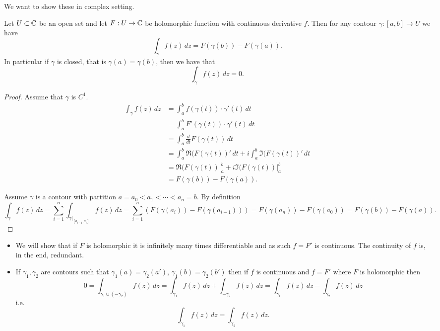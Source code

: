 \documentclass[10pt, a4paper]{article}
\begin{document}
We want to show these in complex setting.

\begin{theorem}
    Let $U \subset \mathbb{C}$ be an open set and let $F : U \to \mathbb{C}$ be holomorphic function with continuous derivative $f$.
    Then for any contour $\gamma : [a, b] \to U$ we have
    \[
    \int_{\gamma}f(z)\,dz = F(\gamma(b)) - F(\gamma(a)).
    \]
    In particular if $\gamma$ is closed,
    that is $\gamma(a) = \gamma(b)$,
    then we have that
    \[
    \int_{\gamma}f(z)\,dz = 0.
    \]

    \begin{proof}
        Assume that $\gamma$ is $C ^ 1$.
        \begin{align*}
            \int_{\gamma}f(z)\,dz &= \int_{a}^{b}f(\gamma(t))\cdot\gamma'(t)\,dt \\
            &= \int_{a}^{b}F'(\gamma(t))\cdot\gamma'(t)\,dt \\
            &= \int_{a}^{b}\frac{d}{dt}F(\gamma(t))\,dt \\
            &= \int_{a}^{b}\Re(F(\gamma(t))'\,dt + i\int_{a}^{b}\Im(F(\gamma(t))'\,dt \\
            &= \Re(F(\gamma(t))\big|_{a}^{b} + i\Im(F(\gamma(t))\big|_{a}^{b} \\
            &= F(\gamma(b)) - F(\gamma(a)).
        \end{align*}

        Assume $\gamma$ is a contour with partition $a = a_0 < a_1 < \dotsi < a_n = b$.
        By definition
        \[
        \int_{\gamma}f(z)\,dz = \sum_{i = 1}^{n}\int_{\gamma|_{[a_{i - 1}, a_i]}}f(z)\,dz = \sum_{i = 1}^{n}(F(\gamma(a_i)) - F(\gamma(a_{i - 1}))) = F(\gamma(a_n)) - F(\gamma(a_0)) = F(\gamma(b)) - F(\gamma(a)).
        \]
    \end{proof}
\end{theorem}

\begin{remark}\phantom{}
    \begin{itemize}
        \item We will show that if $F$ is holomorphic it is infinitely many times differentiable and as such $f = F'$ is continuous.
        The continuity of $f$ is,
        in the end,
        redundant.

        \item If $\gamma_1, \gamma_2$ are contours such that $\gamma_1(a) = \gamma_2(a')$,
        $\gamma_1(b) = \gamma_2(b')$ then if $f$ is continuous and $f = F'$ where $F$ is holomorphic then
        \[
        0 = \int_{\gamma_1 \cup (-\gamma_2)}f(z)\,dz  = \int_{\gamma_1}f(z)\,dz + \int_{-\gamma_2}f(z)\,dz = \int_{\gamma_1}f(z)\,dz - \int_{\gamma_2}f(z)\,dz
        \]
        i.e.
        \[
        \int_{\gamma_1}f(z)\,dz = \int_{\gamma_2}f(z)\,dz.
        \]
    \end{itemize}
\end{remark}
\end{document}
